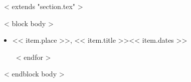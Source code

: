 ~< extends "section.tex" >~

~< block body >~
  \begin{itemize}
    ~< for item in items >~
      \item  << item.place >>, << item.title >>\hfill << item.dates >>
        \iffalse
        \begin{itemize}
          ~< for detail in item.details ->~
            \item <<detail>>
          ~<- endfor ->~
        \end{itemize}
        \fi
    ~< endfor >~
  \end{itemize}
~< endblock body >~
